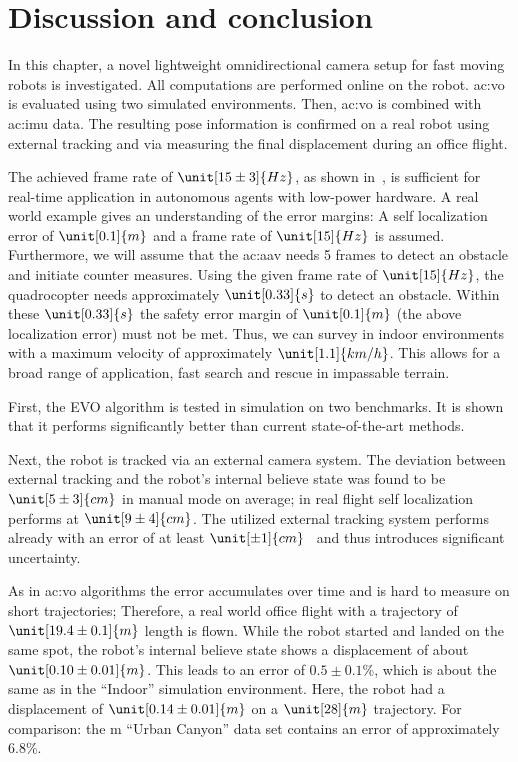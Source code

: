 \section{Discussion and conclusion}
\label{sec:robot_conclusion}

In this chapter, a novel lightweight omnidirectional camera setup for fast moving robots is investigated.
All computations are performed online on the robot.
\gls{ac:vo} is evaluated using two simulated environments.
Then, \gls{ac:vo} is combined with \gls{ac:imu} data.
The resulting pose information is confirmed on a real robot using external tracking and via measuring the final displacement during an office flight.

The achieved frame rate of $\unit[15 \pm 3]{Hz}$, as shown in~, is sufficient for real-time application in autonomous agents with low-power hardware.
A real world example gives an understanding of the error margins: A self localization error of $\unit[0.1]{m}$ and a frame rate of $\unit[15]{Hz}$ is assumed.
Furthermore, we will assume that the \gls{ac:aav} needs 5 frames to detect an obstacle and initiate counter measures.
Using the given frame rate of $\unit[15]{Hz}$, the quadrocopter needs approximately $\unit[0.33]{s}$ to detect an obstacle.
Within these $\unit[0.33]{s}$ the safety error margin of $\unit[0.1]{m}$ (the above localization error) must not be met.
Thus, we can survey in indoor environments with a maximum velocity of approximately $\unit[1.1]{km/h}$.
This allows for a broad range of application, \eg fast search and rescue in impassable terrain.

First, the EVO algorithm is tested in simulation on two benchmarks.
It is shown that it performs significantly better than current state-of-the-art methods.

Next, the robot is tracked via an external camera system.
The deviation between external tracking and the robot's internal believe state was found to be $\unit[5 \pm 3]{cm}$ in manual mode on average; in real flight self localization performs at $\unit[9 \pm 4]{cm}$.
The utilized external tracking system performs already with an error of at least $\unit[\pm 1]{cm}$~\cite{haggag2013measuring} and thus introduces significant uncertainty.

As in \gls{ac:vo} algorithms the error accumulates over time and is hard to measure on short trajectories; Therefore, a real world office flight with a trajectory of $\unit[19.4 \pm 0.1]{m}$ length is flown.
While the robot started and landed on the same spot, the robot's internal believe state shows a displacement of about $\unit[0.10 \pm 0.01]{m}$.
This leads to an error of $0.5\pm 0.1\%$, which is about the same as in the ``Indoor'' simulation environment.
Here, the robot had a displacement of $\unit[0.14\pm 0.01]{m}$ on a $\unit[28]{m}$ trajectory.
For comparison: the \unit[400]{m} ``Urban Canyon'' data set contains an error of approximately $6.8\%$.

